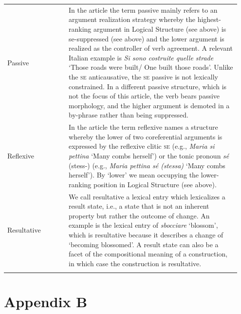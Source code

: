 \documentclass[output=paper,colorlinks,citecolor=brown
]{langscibook}
\begin{document}
\begin{table}[H]
\begin{tabular}{p{0.25\linewidth}p{0.7\linewidth}}
Passive                 & In the article the term passive   mainly refers to an argument realization strategy whereby the highest-ranking   argument in Logical Structure (see above) is se-suppressed   (see above) and the lower argument is realized as the controller of verb   agreement. A relevant Italian example is \textit{Si sono costruite quelle strade}   ‘Those roads were built/ One built those roads’. Unlike the \textsc{se} anticausative, the \textsc{se} passive is not lexically   constrained. In a different passive structure, which is not the focus of this   article, the verb bears passive morphology, and the higher argument is   demoted in a by-phrase rather than being suppressed. \\
Reflexive               & In the article the term reflexive   names a structure whereby the lower of two coreferential arguments is   expressed by the reflexive clitic \textsc{se} (e.g.,   \textit{Maria si pettina} ‘Many combs herself’) or the tonic pronoun \textit{sé}   (stess-) (e.g., \textit{Maria pettina sé (stessa)} ‘Many combs herself’).   By ‘lower’ we mean occupying the lower-ranking position in Logical Structure   (see above).                              \\
Resultative             & We call resultative a   lexical entry which lexicalizes a result state, i.e., a state that is not an   inherent property but rather the outcome of change. An example is the lexical   entry of \textit{sbocciare} ‘blossom’, which is resultative because it   describes a change of ‘becoming blossomed’. A result state can also be a facet   of the compositional meaning of a construction, in which case the   construction is resultative. \\
\lspbottomrule
\end{tabular}
\end{table}


\section*{Appendix B}
\end{document}
